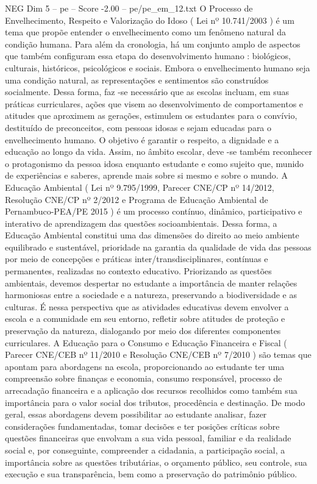\begin{textsample}{NEG Dim 5 – pe – Score -2.00 – pe/pe\_em\_12.txt}
O Processo de Envelhecimento, Respeito e Valorização do Idoso ( Lei nº 10.741/2003 ) é um tema que propõe entender o envelhecimento como um fenômeno natural da condição humana.
Para além da cronologia, há um conjunto amplo de aspectos que também configuram essa etapa do desenvolvimento humano : biológicos, culturais, históricos, psicológicos e sociais.
Embora o envelhecimento humano seja uma condição natural, as representações e sentimentos são construídos socialmente.
Dessa forma, faz -se necessário que as escolas incluam, em suas práticas curriculares, ações que visem ao desenvolvimento de comportamentos e atitudes que aproximem as gerações, estimulem os estudantes para o convívio, destituído de preconceitos, com pessoas idosas e sejam educadas para o envelhecimento humano.
O objetivo é garantir o respeito, a dignidade e a educação ao longo da vida.
Assim, no âmbito escolar, deve -se também reconhecer o protagonismo da pessoa idosa enquanto estudante e como sujeito que, munido de experiências e saberes, aprende mais sobre si mesmo e sobre o mundo.
A Educação Ambiental ( Lei nº 9.795/1999, Parecer CNE/CP nº 14/2012, Resolução CNE/CP nº 2/2012 e Programa de Educação Ambiental de Pernambuco-PEA/PE 2015 ) é um processo contínuo, dinâmico, participativo e interativo de aprendizagem das questões socioambientais.
Dessa forma, a Educação Ambiental constitui uma das dimensões do direito ao meio ambiente equilibrado e sustentável, prioridade na garantia da qualidade de vida das pessoas por meio de concepções e práticas inter/transdisciplinares, contínuas e permanentes, realizadas no contexto educativo.
Priorizando as questões ambientais, devemos despertar no estudante a importância de manter relações harmoniosas entre a sociedade e a natureza, preservando a biodiversidade e as culturas.
É nessa perspectiva que as atividades educativas devem envolver a escola e a comunidade em seu entorno, refletir sobre atitudes de proteção e preservação da natureza, dialogando por meio dos diferentes componentes curriculares.
A Educação para o Consumo e Educação Financeira e Fiscal ( Parecer CNE/CEB nº 11/2010 e Resolução CNE/CEB nº 7/2010 ) são temas que apontam para abordagens na escola, proporcionando ao estudante ter uma compreensão sobre finanças e economia, consumo responsável, processo de arrecadação financeira e a aplicação dos recursos recolhidos como também sua importância para o valor social dos tributos, procedência e destinação.
De modo geral, essas abordagens devem possibilitar ao estudante analisar, fazer considerações fundamentadas, tomar decisões e ter posições críticas sobre questões financeiras que envolvam a sua vida pessoal, familiar e da realidade social e, por conseguinte, compreender a cidadania, a participação social, a importância sobre as questões tributárias, o orçamento público, seu controle, sua execução e sua transparência, bem como a preservação do patrimônio público.

\end{textsample}
